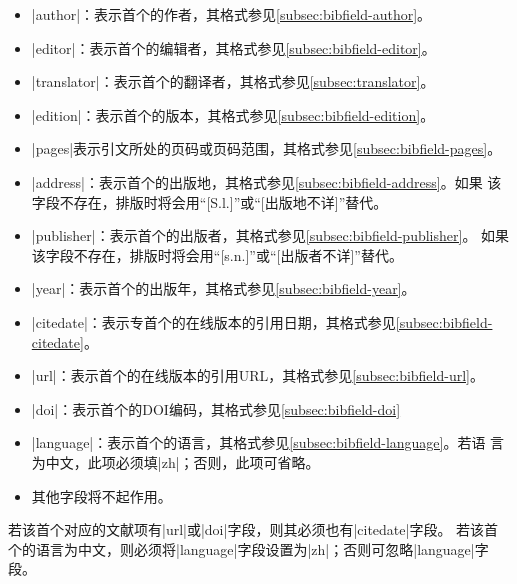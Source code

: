 \begin{itemize}
\item |author|：表示首个的作者，其格式参见\ref{subsec:bibfield-author}。
\item |editor|：表示首个的编辑者，其格式参见\ref{subsec:bibfield-editor}。
\item |translator|：表示首个的翻译者，其格式参见\ref{subsec:translator}。
\item |edition|：表示首个的版本，其格式参见\ref{subsec:bibfield-edition}。
\item |pages|表示引文所处的页码或页码范围，其格式参见\ref{subsec:bibfield-pages}。
\item |address|：表示首个的出版地，其格式参见\ref{subsec:bibfield-address}。如果
  该字段不存在，{\BibTeX}排版时将会用``[S.l.]''或``[出版地不详]''替代。
\item |publisher|：表示首个的出版者，其格式参见\ref{subsec:bibfield-publisher}。
  如果该字段不存在，{\BibTeX}排版时将会用``[s.n.]''或``[出版者不详]''替代。
\item |year|：表示首个的出版年，其格式参见\ref{subsec:bibfield-year}。
\item |citedate|：表示专首个的在线版本的引用日期，其格式参见\ref{subsec:bibfield-citedate}。
\item |url|：表示首个的在线版本的引用URL，其格式参见\ref{subsec:bibfield-url}。
\item |doi|：表示首个的DOI编码，其格式参见\ref{subsec:bibfield-doi}
\item |language|：表示首个的语言，其格式参见\ref{subsec:bibfield-language}。若语
  言为中文，此项必须填|zh|；否则，此项可省略。
\item 其他字段将不起作用。
\end{itemize}


\begin{note}
若该首个对应的文献项有|url|或|doi|字段，则其必须也有|citedate|字段。
若该首个的语言为中文，则必须将|language|字段设置为|zh|；否则可忽略|language|字段。
\end{note}